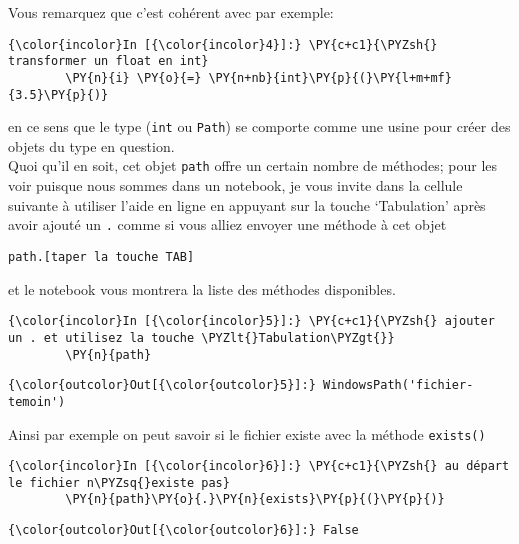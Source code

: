     Vous remarquez que c'est cohérent avec par exemple:

    \begin{Verbatim}[commandchars=\\\{\}]
{\color{incolor}In [{\color{incolor}4}]:} \PY{c+c1}{\PYZsh{} transformer un float en int}
        \PY{n}{i} \PY{o}{=} \PY{n+nb}{int}\PY{p}{(}\PY{l+m+mf}{3.5}\PY{p}{)}
\end{Verbatim}


    en ce sens que le type (\texttt{int} ou \texttt{Path}) se comporte comme
une usine pour créer des objets du type en question.\\

    Quoi qu'il en soit, cet objet \texttt{path} offre un certain nombre de
méthodes; pour les voir puisque nous sommes dans un notebook, je vous
invite dans la cellule suivante à utiliser l'aide en ligne en appuyant
sur la touche `Tabulation' après avoir ajouté un \texttt{.} comme si
vous alliez envoyer une méthode à cet objet

\begin{verbatim}
path.[taper la touche TAB]
\end{verbatim}

et le notebook vous montrera la liste des méthodes disponibles.

    \begin{Verbatim}[commandchars=\\\{\}]
{\color{incolor}In [{\color{incolor}5}]:} \PY{c+c1}{\PYZsh{} ajouter un . et utilisez la touche \PYZlt{}Tabulation\PYZgt{}}
        \PY{n}{path}
\end{Verbatim}


\begin{Verbatim}[commandchars=\\\{\}]
{\color{outcolor}Out[{\color{outcolor}5}]:} WindowsPath('fichier-temoin')
\end{Verbatim}
            
    Ainsi par exemple on peut savoir si le fichier existe avec la méthode
\texttt{exists()}

    \begin{Verbatim}[commandchars=\\\{\}]
{\color{incolor}In [{\color{incolor}6}]:} \PY{c+c1}{\PYZsh{} au départ le fichier n\PYZsq{}existe pas}
        \PY{n}{path}\PY{o}{.}\PY{n}{exists}\PY{p}{(}\PY{p}{)}
\end{Verbatim}


\begin{Verbatim}[commandchars=\\\{\}]
{\color{outcolor}Out[{\color{outcolor}6}]:} False
\end{Verbatim}
            

